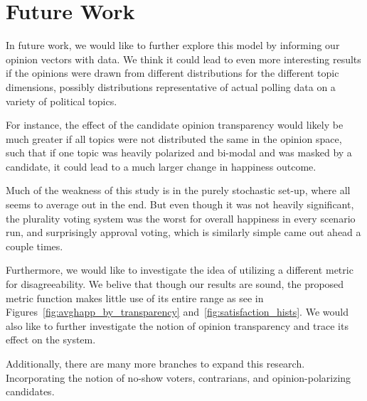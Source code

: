 \section{Future Work}
In future work, we would like to further explore this model by informing our opinion vectors with data.
We think it could lead to even more interesting results if the opinions were drawn from different distributions for the different topic dimensions, possibly distributions representative of actual polling data on a variety of political topics.

For instance, the effect of the candidate opinion transparency would likely be much greater if all topics were not distributed the same in the opinion space, such that if one topic was heavily polarized and bi-modal and was masked by a candidate, it could lead to a much larger change in happiness outcome.

Much of the weakness of this study is in the purely stochastic set-up, where all seems to average out in the end.
But even though it was not heavily significant, the plurality voting system was the worst for overall happiness in every scenario run, and surprisingly approval voting, which is similarly simple came out ahead a couple times.

Furthermore, we would like to investigate the idea of utilizing a different metric for disagreeability. We belive that though our results are sound, the proposed metric function makes little use of its entire range as see in 
Figures~\ref{fig:avghapp_by_transparency} and~\ref{fig:satisfaction_hists}. We would also like to further investigate the notion 
of opinion transparency and trace its effect on the system.

Additionally, there are many more branches to expand this research. Incorporating the notion of no-show voters, contrarians, 
and opinion-polarizing candidates.
